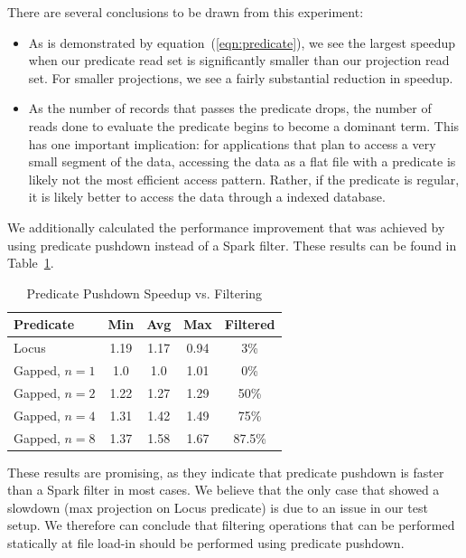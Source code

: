 \documentclass[10pt,twocolumn]{article}
\theoremstyle{plain}
\begin{document}
There are several conclusions to be drawn from this experiment:

\begin{itemize}
\item As is demonstrated by equation~(\ref{eqn:predicate}), we see the largest speedup when our predicate read set is significantly
smaller than our projection read set. For smaller projections, we see a fairly substantial reduction in speedup.
\item As the number of records that passes the predicate drops, the number of reads done to evaluate the predicate begins to become
a dominant term. This has one important implication: for applications that plan to access a very small segment of the data, accessing the
data as a flat file with a predicate is likely not the most efficient access pattern. Rather, if the predicate is regular, it is likely better to access
the data through a indexed database.
\end{itemize}

We additionally calculated the performance improvement that was achieved by using predicate pushdown instead of a Spark filter.
These results can be found in Table~\ref{tab:filter-vs-predicate}.

\begin{table}[h]
\caption{Predicate Pushdown Speedup vs. Filtering}
\label{tab:filter-vs-predicate}
\begin{center}
\begin{tabular}{| l | c  c c | c |}
\hline
\bf Predicate & \bf Min & \bf Avg & \bf Max & \bf Filtered \\
\hline
Locus & 1.19 & 1.17 & 0.94 & 3\% \\
Gapped, $n = 1$ & 1.0 & 1.0 & 1.01 & 0\% \\
Gapped, $n = 2$ & 1.22 & 1.27 & 1.29 & 50\% \\
Gapped, $n = 4$ & 1.31 & 1.42 & 1.49 & 75\% \\
Gapped, $n = 8$ & 1.37 & 1.58 & 1.67 & 87.5\% \\
\hline
\end{tabular}
\end{center}
\end{table}

These results are promising, as they indicate that predicate pushdown is faster than a Spark filter in most cases. We believe that the
only case that showed a slowdown (max projection on Locus predicate) is due to an issue in our test setup. We therefore can conclude
that filtering operations that can be performed statically at file load-in should be performed using predicate pushdown.
\end{document}
